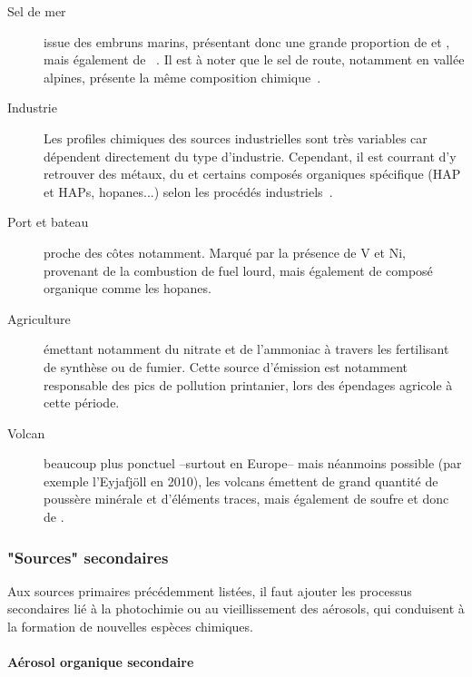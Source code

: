 \begin{description}
    \item[Sel de mer] issue des embruns marins, présentant donc une grande proportion de
         et , mais également de
        ~\autocite{belisCritical2013,odowdMarine1997,pioClimatology2007}. Il
        est à noter que le sel de route, notamment en vallée alpines, présente la même
        composition chimique~\autocite{airrhone-alpesInfluence2012}.

    \item[Industrie] Les profiles chimiques des sources industrielles sont très variables
        car dépendent directement du type d'industrie. Cependant, il est courrant d'y
        retrouver des métaux, du \SOq et certains composés organiques spécifique (HAP et
        HAPs, hopanes...) selon les procédés
        industriels~\autocite{sylvestreComprehensive2017}.

    \item[Port et bateau] proche des côtes notamment. Marqué par la présence de V et Ni,
        provenant de la combustion de fuel lourd, mais également de composé organique
        comme les hopanes.

    \item[Agriculture] émettant notamment du nitrate et de l'ammoniac à travers les
        fertilisant de synthèse ou de fumier. Cette source d'émission est notamment
        responsable des pics de pollution printanier, lors des épendages agricole à cette
        période.

    \item[Volcan] beaucoup plus ponctuel --surtout en Europe-- mais néanmoins possible
        (par exemple l'Eyjafjöll en 2010), les volcans émettent de grand quantité de
        poussère minérale et d'éléments traces, mais également de soufre et donc de \SOq.

\end{description}

\subsubsection{"Sources" secondaires}%
\label{ssub:_sources_secondaires}

Aux sources primaires précédemment listées, il faut ajouter les processus secondaires lié
à la photochimie ou au vieillissement des aérosols, qui conduisent à la formation de
nouvelles espèces chimiques.

\paragraph{Aérosol organique secondaire}%
\label{par:aérosol_organique_secondaire}

